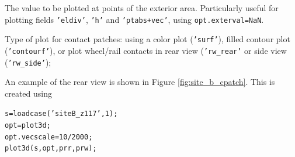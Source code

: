 \documentclass[12pt]{report}
\begin{document}
\begin{description}[leftmargin=6em,style=nextline]
\item[exterval] The value to be plotted at points of the exterior area.
        Particularly useful for plotting fields {\tt 'eldiv'}, {\tt 'h'}
        and {\tt 'ptabs+vec'}, using {\tt opt.exterval=NaN}.
\item[typplot] Type of plot for contact patches: using a color plot
        ({\tt 'surf'}), filled contour plot ({\tt 'contourf'}), or plot
        wheel/rail contacts in rear view ({\tt 'rw\_rear'} or side view
        ({\tt 'rw\_side'});

An example of the rear view is shown in Figure \ref{fig:site_b_cpatch}. This
is created using
\begin{alltt}\small
  s = loadcase('siteB_z117',1);
  opt          = plot3d;
  opt.vecscale = 10/2000; %
  plot3d( s, opt, prr, prw );
\end{alltt}


\end{description}
\end{document}
